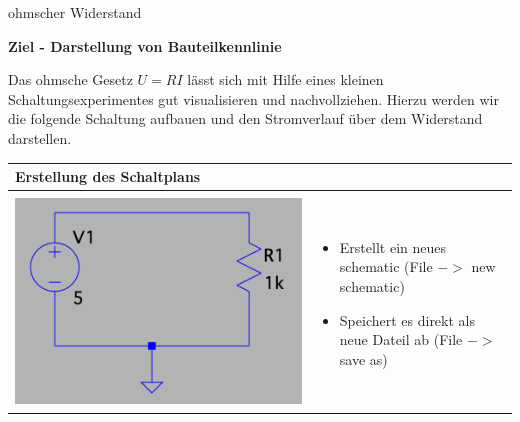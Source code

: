 \begin{frame}[t]{ohmscher Widerstand}

    \textbf{Ziel - Darstellung von Bauteilkennlinie}
    
    \begin{spacing}{0.6} \begin{tiny}
    
    Das ohmsche Gesetz $U=R I$ lässt sich mit Hilfe eines kleinen Schaltungsexperimentes gut visualisieren und nachvollziehen. 
    Hierzu werden wir die folgende Schaltung aufbauen und den Stromverlauf über dem Widerstand darstellen. 
    \end{tiny} \end{spacing}
    \begin{spacing}{0.9} \begin{tiny}
    \begin{table}[h!]
      \begin{tabular}{p{3cm} p{7cm}}
        \hline
        \textbf{Erstellung des Schaltplans} & \\
        \hline \\
        \begin{minipage}{.3\textwidth}
          \includegraphics[width=\linewidth]{pictures/res.png}
        \end{minipage} 
        & 
        \begin{minipage}{.7\textwidth}
        \begin{itemize}
          \item Erstellt ein neues schematic (File $->$ new schematic)
          \item Speichert es direkt als neue Dateil ab (File $->$ save as)

\end{itemize}
\end{minipage}
\end{tabular}
\end{table}
\end{tiny}
\end{spacing}
\end{frame}
